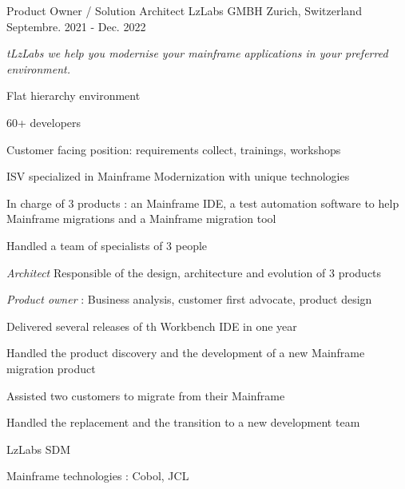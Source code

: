 \begin{cventries}
    \cventry
    {Product Owner / Solution Architect} %
    {LzLabs GMBH} %
    {Zurich, Switzerland} %
    {Septembre. 2021 - Dec. 2022} %
    {
        \experience
            {
                \begin{cvitems} %
                    \item{\emph{tLzLabs we help you modernise your mainframe applications in your preferred environment.}}
                    \item{Flat hierarchy environment}
                    \item{60+ developers}
                    \item{Customer facing position: requirements collect, trainings, workshops }
                    \item{ISV specialized in Mainframe Modernization with unique technologies}
                    \item{In charge of 3 products : an Mainframe IDE, a test automation software to help Mainframe migrations and a Mainframe migration tool }
                    \item{Handled a team of specialists of 3 people}
                    \item {\emph{Architect} Responsible of the design, architecture and evolution of 3 products }
                    \item {\emph{Product owner} : Business analysis, customer first advocate, product design }
                    \end{cvitems}
            }
            {
               \begin{cvitems} %
                \item {Delivered several releases of th Workbench IDE in one year }
                \item {Handled the product discovery and the development of a new Mainframe migration product }
                \item {Assisted two customers to migrate from their Mainframe }
                \item {Handled the replacement and the transition to a new development team}
               \end{cvitems}
            }
            {
                \begin{cvitems} %
                    \item{LzLabs SDM}
                    \item{Mainframe technologies : Cobol, JCL}

\end{cvitems}}}
\end{cventries}
